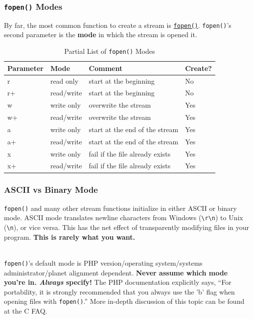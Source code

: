 \documentclass[aspectratio=169]{beamer}
\begin{document}
\begin{frame}
\frametitle{\texttt{fopen()} Modes}
By far, the most common function to create a stream is  \href{http://php.net/manual/en/function.fopen.php}{\texttt{fopen()}}. \texttt{fopen()}'s second parameter is the \textbf{mode} in which the stream is opened it.
\begin{table}
\begin{tabular}{|l|l|l|l|}
\hline
\textbf{Parameter} & \textbf{Mode} & \textbf{Comment} & \textbf{Create?}\\
\hline
r & read only & start at the beginning & No\\
\hline
r+ & read/write & start at the beginning & No\\
\hline
w & write only & overwrite the stream & Yes\\
\hline
w+ & read/write & overwrite the stream & Yes\\
\hline
a & write only & start at the end of the stream & Yes\\
\hline
a+ & read/write & start at the end of the stream & Yes\\
\hline
x & write only & fail if the file already exists & Yes\\
\hline
x+ & read/write & fail if the file already exists & Yes\\
\hline
\end{tabular}
\caption{Partial List of \texttt{fopen()} Modes}
\end{table}
\end{frame}

\begin{frame}
\frametitle{ASCII vs Binary Mode}
\texttt{fopen()} and many other stream functions initialize in either ASCII or binary mode. ASCII mode translates newline characters from Windows (\texttt{\textbackslash r\textbackslash n}) to Unix (\texttt{\textbackslash n}), or vice versa. This has the net effect of transparently modifying files in your program. \textbf{This is rarely what you want.}

\mbox{}\\
\texttt{fopen()}'s default mode is PHP version/operating system/systems administrator/planet alignment dependent. \textbf{Never assume which mode you're in. \emph{Always} specify!} The PHP documentation explicitly says, ``For portability, it is strongly recommended that you always use the 'b' flag when opening files with \texttt{fopen()}.'' \cite{php-fopen} More in-depth discussion of this topic can be found at the C FAQ. \cite{cfaq}
\end{frame}
\end{document}
